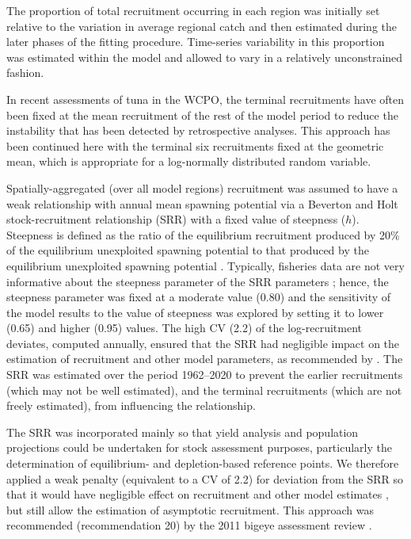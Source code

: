 The proportion of total recruitment occurring in each region was initially set relative to the variation in average regional catch and then estimated during the later phases of the fitting procedure. Time-series variability in this proportion was estimated within the model and allowed to vary in a relatively unconstrained fashion.

In recent assessments of tuna in the WCPO, the terminal recruitments have often been fixed at the mean recruitment of the rest of the model period to reduce the instability that has been detected by retrospective analyses. This approach has been continued here with the terminal six recruitments fixed at the geometric mean, which is appropriate for a log-normally distributed random variable.

Spatially-aggregated (over all model regions) recruitment was assumed to have a weak relationship with annual mean spawning potential via a Beverton and Holt stock-recruitment relationship (SRR) with a fixed value of steepness ($h$). Steepness is defined as the ratio of the equilibrium recruitment produced by 20\% of the equilibrium unexploited spawning potential to that produced by the equilibrium unexploited spawning potential \citep{francis_use_1992, harley_preliminary_2011}. Typically, fisheries data are not very informative about the steepness parameter of the SRR parameters \citep{issf_report_2011}; hence, the steepness parameter was fixed at a moderate value (0.80) and the sensitivity of the model results to the value of steepness was explored by setting it to lower (0.65) and higher (0.95) values. The high CV (2.2) of the log-recruitment deviates, computed annually, ensured that the SRR had negligible impact on the estimation of recruitment and other model parameters, as recommended by \citet{ianelli_independent_2012}. The SRR was estimated over the period 1962--2020 to prevent the earlier recruitments (which may not be well estimated), and the terminal recruitments (which are not freely estimated), from influencing the relationship.

The SRR was incorporated mainly so that yield analysis and population projections could be undertaken for stock assessment purposes, particularly the determination of equilibrium- and depletion-based reference points. We therefore applied a weak penalty (equivalent to a CV of 2.2) for deviation from the SRR so that it would have negligible effect on recruitment and other model estimates \citep{hampton_spatially-disaggregated_2001}, but still allow the estimation of asymptotic recruitment. This approach was recommended (recommendation 20) by the 2011 bigeye assessment review \citep{ianelli_independent_2012}.

